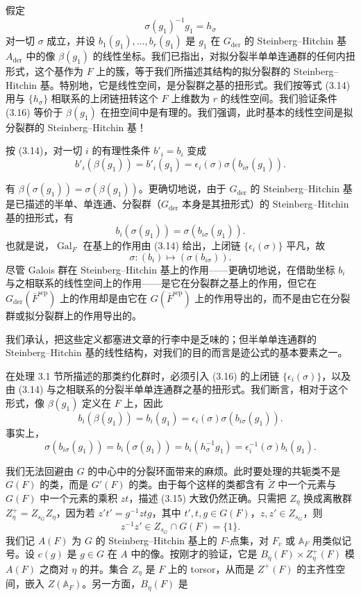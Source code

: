 假定
\begin{equation}\tag{3.16}
\sigma(g_1)^{-1}g_1=h_\sigma
\end{equation}
对一切 $\sigma$ 成立，并设 $b_1(g_1),\dots,b_r(g_1)$ 是 $g_1$ 在 $G_{\mathrm{der}}$ 的 Steinberg–Hitchin 基 $A_{\mathrm{der}}$ 中的像 $\beta(g_1)$ 的线性坐标。我们已指出，对拟分裂半单单连通群的任何内扭形式，这个基作为 $F$ 上的簇，等于我们所描述其结构的拟分裂群的 Steinberg–Hitchin 基。特别地，它是线性空间，是分裂群之基的扭形式。我们按等式 (3.14) 用与 $\{h_\sigma\}$ 相联系的上闭链扭转这个 $F$ 上维数为 $r$ 的线性空间。我们验证条件 (3.16) 等价于 $\beta(g_1)$ 在扭空间中是有理的。我们强调，此时基本的线性空间是拟分裂群的 Steinberg–Hitchin 基！

按 (3.14)，对一切 $i$ 的有理性条件 $b'_i=b_i$ 变成
\[
b'_i(\beta(g_1))=b'_i(g_1)=\epsilon_i(\sigma)\sigma(b_{i\sigma}(g_1)).
\]

有 $\beta(\sigma(g_1))=\sigma(\beta(g_1))$。更确切地说，由于 $G_{\mathrm{der}}$ 的 Steinberg–Hitchin 基是已描述的半单、单连通、分裂群（$G_{\mathrm{der}}$ 本身是其扭形式）的 Steinberg–Hitchin 基的扭形式，有
\[
b_i(\sigma(g_1))=\sigma(b_{i\sigma}(g_1)).
\]
也就是说，$\operatorname{Gal}_F$ 在基上的作用由 (3.14) 给出，上闭链 $\{\epsilon_i(\sigma)\}$ 平凡，故
\[
\sigma:(b_i)\mapsto(\sigma(b_{i\sigma})).
\]
尽管 Galois 群在 Steinberg–Hitchin 基上的作用——更确切地说，在借助坐标 $b_i$ 与之相联系的线性空间上的作用——是它在分裂群之基上的作用，但它在 $G_{\mathrm{der}}(\bar F^{\mathrm{sep}})$ 上的作用却是由它在 $G(\bar F^{\mathrm{sep}})$ 上的作用导出的，而不是由它在分裂群或拟分裂群上的作用导出的。

我们承认，把这些定义都塞进文章的行李中是乏味的；但半单单连通群的 Steinberg–Hitchin 基的线性结构，对我们的目的而言是迹公式的基本要素之一。

在处理 3.1 节所描述的那类约化群时，必须引入 (3.16) 的上闭链 $\{\epsilon_i(\sigma)\}$，以及由 (3.14) 与之相联系的分裂半单单连通群之基的扭形式。我们断言，相对于这个形式，像 $\beta(g_1)$ 定义在 $F$ 上，因此
\[
b_i(\beta(g_1))=b_i(g_1)=\epsilon_i(\sigma)\sigma(b_{i\sigma}(g_1)).
\]
事实上，
\[
\sigma(b_{i\sigma}(g_1))=b_i(\sigma(g_1))=b_i(h_\sigma^{-1}g_1)=\epsilon_i^{-1}(\sigma)b_i(g_1).
\]

我们无法回避由 $G$ 的中心中的分裂环面带来的麻烦。此时要处理的共轭类不是 $G(F)$ 的类，而是 $G'(F)$ 的类。由于每个这样的类都含有 $\tilde Z$ 中一个元素与 $G(F)$ 中一个元素的乘积 $zt$，描述 (3.15) 大致仍然正确。只需把 $Z_\eta$ 换成离散群 $Z^+_\eta=Z_{s_G}Z_\eta$，因为若 $z't'=g^{-1}ztg$，其中 $t',t,g\in G(F)$，$z,z'\in Z_{s_G}$，则
\[
z^{-1}z'\in Z_{s_G}\cap G(F)=\{1\}.
\]
我们记 $A(F)$ 为 $G$ 的 Steinberg–Hitchin 基上的 $F$-点集，对 $F_v$ 或 $\mathbb A_F$ 用类似记号。设 $c(g)$ 是 $g\in G$ 在 $A$ 中的像。按刚才的验证，它是 $B_\eta(F)\times Z^+_\eta(F)$ 模 $A(F)$ 之商对 $\eta$ 的并。集合 $Z_\eta$ 是 $F$ 上的 torsor，从而是 $Z^+(F)$ 的主齐性空间，嵌入 $Z(\mathbb A_F)$。另一方面，$B_\eta(F)$ 是

